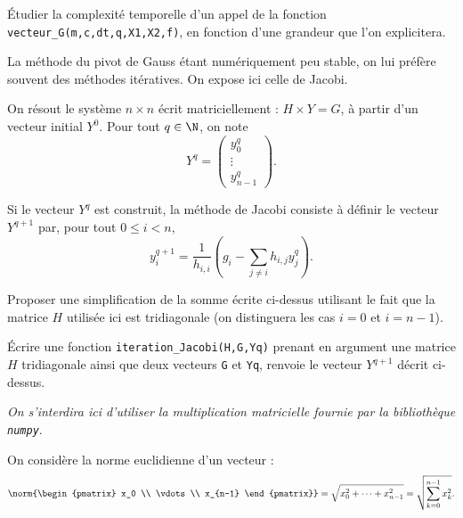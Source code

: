 \medskip{}

\question{} Étudier la complexité temporelle d'un appel de la fonction \texttt{vecteur\_G(m,c,dt,q,X1,X2,f)}, en fonction d'une grandeur que l'on explicitera. 

\medskip{}

La méthode du pivot de Gauss étant numériquement peu stable, on lui préfère souvent des méthodes itératives. On expose ici celle de Jacobi. 

\medskip{}

On résout le système $n\times n$ écrit matriciellement : $H\times Y = G$, à partir d'un vecteur initial $Y^0$. 
Pour tout $q \in \N$, on note 
\begin{equation*}
  Y^q = \begin{pmatrix} y^q_0 \\ \vdots \\ y^q_{n-1} \end{pmatrix}.
\end{equation*}


Si le vecteur $Y^q$ est construit, la méthode de Jacobi consiste à définir le vecteur $Y^{q+1}$ par, pour tout $0 \leq i < n$,
\begin{equation*}
  y^{q+1}_i = \dfrac{1}{h_{i,i}} \left(g_i - \sum_{j\neq i} h_{i,j} y^q_j\right).
\end{equation*}

\medskip{}

\question{} Proposer une simplification de la somme écrite ci-dessus utilisant le fait que la matrice $H$ utilisée ici est tridiagonale (on distinguera les cas $i=0$ et $i=n-1$).

\medskip{}

\question{} Écrire une fonction \texttt{iteration\_Jacobi(H,G,Yq)} prenant en argument une matrice $H$ tridiagonale ainsi que deux vecteurs \texttt{G} et \texttt{Yq}, renvoie le vecteur $Y^{q+1}$ décrit ci-dessus.

\emph{On s'interdira ici d'utiliser la multiplication matricielle fournie par la bibliothèque \texttt{numpy}}.

\medskip{}

On considère la norme euclidienne d'un vecteur : 
\begin{equation*}
  \norm{\begin{pmatrix} x_0 \\ \vdots \\ x_{n-1} \end{pmatrix}} = \sqrt{x_0^2 + \dots + x_{n-1}^2} = \sqrt{\sum_{k=0}^{n-1}x_k^2}.
\end{equation*}

